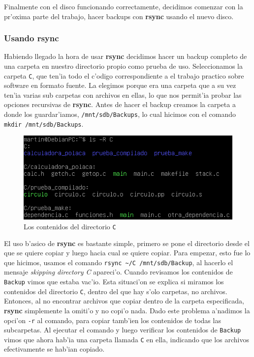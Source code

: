 \documentclass[11pt]{article}
\newcommand{\rsync}[0]{\textbf{rsync}}
\newcommand{\backup}[0]{\texttt{Backup}}
\begin{document}
		Finalmente con el disco funcionando correctamente, decidimos comenzar con la pr'oxima parte del trabajo, hacer backups con \rsync{} usando el nuevo disco.

	\subsubsection{Usando rsync}
		Habiendo llegado la hora de usar \rsync{} decidimos hacer un backup completo de una carpeta en nuestro directorio propio como prueba de uso. Seleccionamos la carpeta \texttt{C}, que ten'ia todo el c'odigo correspondiente a el trabajo practico sobre software en formato fuente. La elegimos porque era una carpeta que a su vez ten'ia varias sub carpetas con archivos en ellas, lo que nos permit'ia probar las opciones recursivas de \rsync{}. Antes de hacer el backup creamos la carpeta a donde los guardar'iamos, \texttt{/mnt/sdb/Backups}, lo cual hicimos con el comando \texttt{mkdir /mnt/sdb/Backups}.

		\begin{figure}[H]
    			\centering
    			\includegraphics[scale=0.80]{Images/rsync/rsync_backup_C_contents.PNG}
    			\caption{Los contenidos del directorio \texttt{C}}
    			\label{fig:rsync_C_contents}
		\end{figure}

		El uso b'asico de \rsync{} es bastante simple, primero se pone el directorio desde el que se quiere copiar y luego hacia cual se quiere copiar. Para empezar, esto fue lo que hicimos, usamos el comando \texttt{rsync \textasciitilde/C /mnt/sdb/Backup}, al hacerlo el mensaje \textit{skipping directory C} apareci'o. Cuando revisamos los contenidos de \backup{} vimos que estaba vac'io. Esta situaci'on se explica si miramos los contenidos del directorio \texttt{C}, dentro del que hay s'olo carpetas, no archivos. Entonces, al no encontrar archivos que copiar dentro de la carpeta especificada, \rsync{} simplemente la omiti'o y no copi'o nada. Dado este problema a'nadimos la opci'on \texttt{-r} al comando, para copiar tamb'ien los contenidos de todas las subcarpetas. Al ejecutar el comando y luego verificar los contenidos de \backup{} vimos que ahora hab'ia una carpeta llamada \texttt{C} en ella, indicando que los archivos efectivamente se hab'ian copiado.
\end{document}
